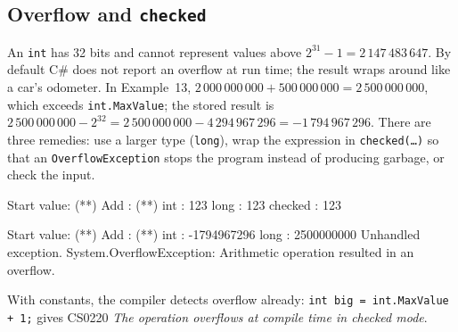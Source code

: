 \subsection{Overflow and \texttt{checked}}
An \texttt{int} has 32 bits and cannot represent values above $2^{31}-1 = 2\,147\,483\,647$. By default C\# does not report an overflow at run time; the result wraps around like a car's odometer. In Example~13, $2\,000\,000\,000 + 500\,000\,000 = 2\,500\,000\,000$, which exceeds \texttt{int.MaxValue}; the stored result is $2\,500\,000\,000 - 2^{32} = 2\,500\,000\,000 - 4\,294\,967\,296 = -1\,794\,967\,296$. There are three remedies: use a larger type (\texttt{long}), wrap the expression in \texttt{checked(\dots)} so that an \texttt{OverflowException} stops the program instead of producing garbage, or check the input.

\begin{center}
\begin{minipage}[t]{0.34\linewidth}
\begin{consolebox}[Run 1]
\begin{run}
Start value: (**)
Add        : (**)
int     : 123
long    : 123
checked : 123
\end{run}
\end{consolebox}
\end{minipage}\hfill
\begin{minipage}[t]{0.63\linewidth}
\begin{consolebox}
\begin{run}
Start value: (**)
Add        : (**)
int     : -1794967296
long    : 2500000000
Unhandled exception. System.OverflowException: Arithmetic operation resulted in an overflow.
\end{run}
\end{consolebox}
\end{minipage}
\end{center}
With constants, the compiler detects overflow already: \texttt{int big = int.MaxValue + 1;} gives CS0220 \emph{The operation overflows at compile time in checked mode}.

